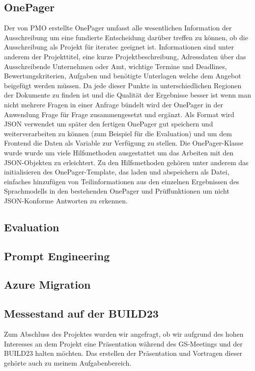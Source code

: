 \subsection{OnePager}
Der von PMO erstellte OnePager umfasst alle wesentlichen Information der Ausschreibung um eine fundierte Entscheidung darüber treffen zu 
können, ob die Ausschreibung als Projekt für iteratec geeignet ist. Informationen sind unter anderem der Projekttitel, eine kurze Projektbeschreibung, 
Adressdaten über das Ausschreibende Unternehmen oder Amt, wichtige Termine und Deadlines, Bewertungskriterien, Aufgaben und benötigte Unterlagen welche 
dem Angebot beigefügt werden müssen. Da jede dieser Punkte in unterschiedlichen Regionen der Dokumente zu finden ist und die Qualität der Ergebnisse 
besser ist wenn man nicht mehrere Fragen in einer Anfrage bündelt wird der OnePager in der Anwendung Frage für Frage zusammengesetzt und ergänzt.
Als Format wird JSON verwendet um später den fertigen OnePager gut speichern und weiterverarbeiten zu können (zum Beispiel für die Evaluation) und um dem
Frontend die Daten als Variable zur Verfügung zu stellen. Die OnePager-Klasse wurde wurde um viele Hilfsmethoden ausgestattet um das Arbeiten mit den 
JSON-Objekten zu erleichtert. Zu den Hilfsmethoden gehören unter anderem das initialisieren des OnePager-Template, das laden und abspeichern als Datei, 
einfaches hinzufügen von Teilinformationen aus den einzelnen Ergebnissen des Sprachmodells in den bestehenden OnePager und Prüffunktionen um nicht 
JSON-Konforme Antworten zu erkennen. 

\subsection{Evaluation}

\subsection{Prompt Engineering}

\subsection{Azure Migration}

\subsection{Messestand auf der BUILD23}

Zum Abschluss des Projektes wurden wir angefragt, ob wir 
aufgrund des hohen Interesses an dem Projekt eine Präsentation während des GS-Meetings und der BUILD23 halten möchten. 
Das erstellen der Präsentation und Vortragen dieser gehörte auch zu meinem Aufgabenbereich.

